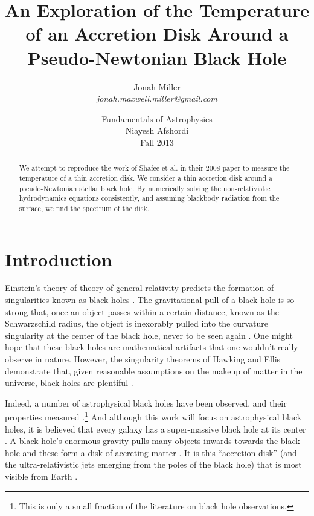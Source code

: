 \documentclass[]{article}
\title{An Exploration of the Temperature of an Accretion Disk Around a
  Pseudo-Newtonian Black Hole}
\author{Jonah Miller\\
  \textit{jonah.maxwell.miller@gmail.com}}
\date{Fundamentals of
  Astrophysics\\ Niayesh Afshordi\\ Fall 2013}
\begin{document}
\maketitle

\begin{abstract}
  We attempt to reproduce the work of Shafee et al. in their 2008
  paper \cite{Shafee08} to measure the temperature of a thin accretion
  disk. We consider a thin accretion disk around a pseudo-Newtonian
  stellar black hole. By numerically solving the non-relativistic
  hydrodynamics equations consistently, and assuming blackbody
  radiation from the surface, we find the spectrum of the disk.
\end{abstract}

\section{Introduction}
\label{sec:intro}

Einstein's theory of theory of general relativity predicts the
formation of singularities known as black holes \cite{Wald}. The
gravitational pull of a black hole is so strong that, once an object
passes within a certain distance, known as the Schwarzschild radius,
the object is inexorably pulled into the curvature singularity at the
center of the black hole, never to be seen again \cite{Wald}. One
might hope that these black holes are mathematical artifacts that one
wouldn't really observe in nature. However, the singularity theorems
of Hawking and Ellis demonstrate that, given reasonable assumptions on
the makeup of matter in the universe, black holes are plentiful
\cite{HawkingEllis}.

Indeed, a number of astrophysical black holes have been observed, and
their properties measured
\cite{McClintock06,Liu08,Gou09,Frank}.\footnote{This is only a small
  fraction of the literature on black hole observations.} And although
this work will focus on astrophysical black holes, it is believed that
every galaxy has a super-massive black hole at its center
\cite{PadmanabhanTA}. A black hole's enormous gravity pulls many
objects inwards towards the black hole and these form a disk of
accreting matter \cite{Frank,Melia}. It is this ``accretion disk''
(and the ultra-relativistic jets emerging from the poles of the black
hole) that is most visible from Earth \cite{Frank,Melia}.
\end{document}
